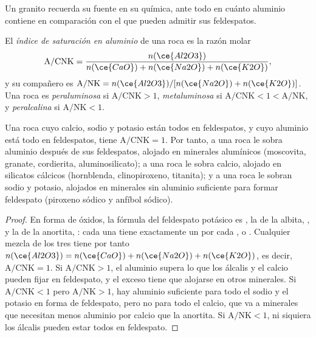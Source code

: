 Un granito recuerda su fuente en su química, ante todo en cuánto aluminio contiene
en comparación con el que pueden admitir sus feldespatos.

\begin{definition}\label{def:b2:crustal-melting:asi}
El \emph{índice de saturación en aluminio} de una roca es la
razón molar
\[\mathrm{A/CNK} = \frac{n(\ce{Al2O3})}{n(\ce{CaO}) + n(\ce{Na2O}) + n(\ce{K2O})},\]
y su compañero es $\mathrm{A/NK} = n(\ce{Al2O3})/[n(\ce{Na2O}) + n(\ce{K2O})]$. Una roca
es \emph{peraluminosa} si $\mathrm{A/CNK} > 1$,
\emph{metaluminosa} si $\mathrm{A/CNK} < 1 < \mathrm{A/NK}$, y
\emph{peralcalina} si $\mathrm{A/NK} < 1$.
\end{definition}

\begin{proposition}\label{prop:b2:crustal-melting:feldspar}
Una roca cuyo calcio, sodio y potasio están todos en feldespatos, y cuyo aluminio está
todo en feldespatos, tiene $\mathrm{A/CNK} = 1$. Por tanto, a una roca  le sobra aluminio
después de sus feldespatos, alojado en minerales alumínicos (moscovita, granate, cordierita,
aluminosilicato); a una roca  le sobra calcio, alojado en silicatos cálcicos
(hornblenda, clinopiroxeno, titanita); y a una roca  le sobran sodio y potasio,
alojados en minerales sin aluminio suficiente para formar feldespato (piroxeno sódico y
anfíbol sódico).
\end{proposition}

\begin{proof}
En forma de óxidos, la fórmula del feldespato potásico es , la de la albita, , y
la de la anortita, : cada una tiene exactamente un  por cada
,  o . Cualquier mezcla de los tres tiene por tanto $n(\ce{Al2O3}) =
n(\ce{CaO}) + n(\ce{Na2O}) + n(\ce{K2O})$, es decir, $\mathrm{A/CNK} = 1$. Si
$\mathrm{A/CNK} > 1$, el aluminio supera lo que los álcalis y el calcio pueden fijar en
feldespato, y el exceso tiene que alojarse en otros minerales. Si $\mathrm{A/CNK} < 1$ pero
$\mathrm{A/NK} > 1$, hay aluminio suficiente para todo el sodio y el potasio en forma de
feldespato, pero no para todo el calcio, que va a minerales que necesitan menos aluminio
por calcio que la anortita. Si $\mathrm{A/NK} < 1$, ni siquiera los álcalis pueden estar todos en
feldespato.
\end{proof}


